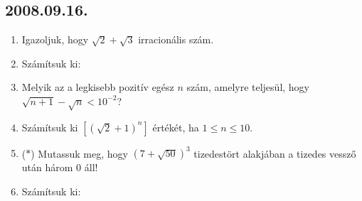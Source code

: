 \subsection*{2008.09.16.}
\begin{enumerate}
\item Igazoljuk, hogy $\sqrt{2}+\sqrt{3}$ irracionális szám.
\item Számítsuk ki:

\item Melyik az a legkisebb pozitív egész $n$ szám, amelyre teljesül, hogy $\sqrt{n+1}-\sqrt{n}<10^{-2}$?
\item Számítsuk ki $[(\sqrt{2}+1)^n]$ értékét, ha $1\leq n\leq 10$.
\item ($*$) Mutassuk meg, hogy $(7+\sqrt{50})^3$ tizedestört alakjában a tizedes vessző után három $0$ áll!
\item Számítsuk ki:

\end{enumerate}

